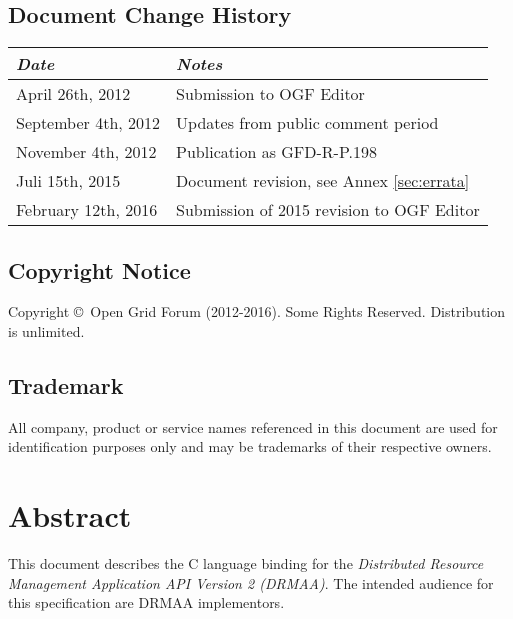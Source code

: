 \documentclass{article}
\newcommand{\copyrightyears}{2012-2016}
\begin{document}
\subsection*{Document Change History}
\vspace*{-1em}
\begin{table}[ht]
\centering
\begin{tabularx}{\textwidth}{XX}
\toprule
\emph{Date} & \emph{Notes} \\
\midrule
April     26th, 2012 & Submission to OGF Editor \\
September  4th, 2012 & Updates from public comment period \\
November   4th, 2012 & Publication as  GFD-R-P.198 \\
Juli      15th, 2015 & Document revision, see Annex \ref{sec:errata} \\
February  12th, 2016 & Submission of 2015 revision to OGF Editor \\
\bottomrule
\end{tabularx}
\end{table}
\vspace*{1em}


\subsection*{Copyright Notice}

Copyright \copyright \ Open Grid Forum (\copyrightyears).  Some Rights Reserved.
Distribution is unlimited.\\

\subsection*{Trademark}

All company, product or service names referenced in this document are used for identification purposes only and may be trademarks of their respective owners. \\

\section*{Abstract}

This document describes the C language binding for the \emph{Distributed Resource Management Application API Version 2 (DRMAA)}. The intended audience for this specification are DRMAA implementors. \\

\end{document}
